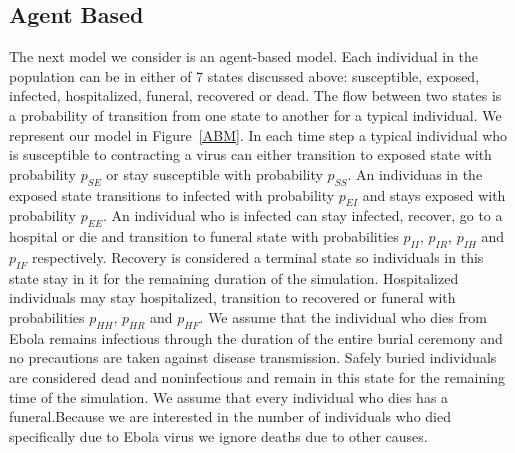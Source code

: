 \documentclass[10pt]{article}
\begin{document}
%
%
% 
%        
%  
%       
%
%
%
%        
%
%
\subsection{Agent Based} 
The next model we consider is an agent-based model. Each individual in the population can be in either of 7 states discussed above: susceptible, exposed, infected, hospitalized, funeral, recovered or dead. The flow between two states is a  probability of transition from one state to another for a typical individual. We represent our model in Figure~\ref{ABM}. In each time step a typical individual who is susceptible to contracting a virus can either transition to exposed state with probability $p_{SE}$ or stay susceptible with probability $p_{SS}$. An individuas in the exposed state transitions to infected with probability $p_{EI}$ and stays exposed with probability $p_{EE}$. An individual who is infected can stay infected, recover, go to a hospital or die and transition to funeral state with probabilities $p_{II},\, p_{IR},\, p_{IH}$ and $p_{IF}$ respectively. Recovery is considered a terminal state so individuals in this state stay in it for the remaining duration of the simulation. Hospitalized individuals may stay hospitalized, transition to recovered or funeral with probabilities $p_{HH}, \, p_{HR}$ and $p_{HF}$. We assume that the individual who dies from Ebola remains infectious through the duration of the entire burial ceremony and no precautions are taken against disease transmission. Safely buried individuals are considered dead and noninfectious and remain in this state for the remaining time of the simulation. We assume that every individual who dies has a funeral.Because we are interested in the number of individuals who died specifically due to Ebola virus we ignore deaths due to other causes.  
\end{document}
